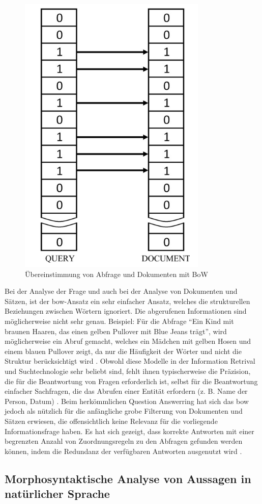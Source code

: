 \documentclass[
        ngerman,
        paper=a4,
        numbers=noendperiod,
]{scrreprt}
\begin{document}
\begin{figure}[H]
\centering\includegraphics[width=0.3\linewidth]{images/bow.png}
\caption[Übereinstimmung von Abfrage und Dokumenten mit BoW]{Übereinstimmung von Abfrage und Dokumenten mit BoW \cite [S. 5419]{Kolomiyets2011APerspective}}
\label{fig:bow}
\end{figure}

Bei der Analyse der Frage und auch bei der Analyse von Dokumenten und Sätzen, ist der \ac{bow}-Ansatz ein sehr einfacher Ansatz, welches die strukturellen Beziehungen zwischen Wörtern ignoriert. Die abgerufenen Informationen sind möglicherweise nicht sehr genau. Beispiel: Für die Abfrage \enquote{Ein Kind mit braunen Haaren, das einen gelben Pullover mit Blue Jeans trägt}, wird möglicherweise ein Abruf gemacht, welches ein Mädchen mit gelben Hosen und einem blauen Pullover zeigt, da nur die Häufigkeit der Wörter und nicht die Struktur berücksichtigt wird \citep [S. 5419]{Kolomiyets2011APerspective}. Obwohl diese Modelle in der Information Retrival und Suchtechnologie sehr beliebt sind, fehlt ihnen typischerweise die Präzision, die für die Beantwortung von Fragen erforderlich ist, selbst für die Beantwortung einfacher Sachfragen, die das Abrufen einer Entität erfordern (z. B. Name der Person, Datum) \citep{moldovan2003performance}. Beim  herkömmlichen Question Answerring hat sich das \ac{bow} jedoch als nützlich für die anfängliche grobe Filterung von Dokumenten und Sätzen erwiesen, die offensichtlich keine Relevanz für die vorliegende Informationsfrage haben. Es hat sich gezeigt, dass korrekte Antworten mit einer begrenzten Anzahl von Zuordnungsregeln zu den Abfragen gefunden werden können, indem die Redundanz der verfügbaren Antworten ausgenutzt wird \citep{brill2001data}.

    
    
\subsection{Morphosyntaktische Analyse von Aussagen in natürlicher Sprache}
\end{document}
